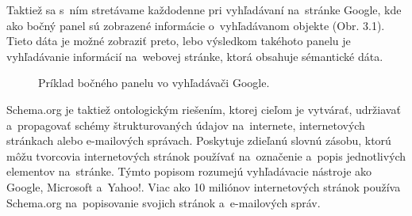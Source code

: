 \documentclass[12pt, a4paper, oneside]{book}
\begin{document}

Taktiež sa s~ním stretávame každodenne pri vyhľadávaní na~stránke Google, kde ako bočný panel sú zobrazené informácie o~vyhľadávanom objekte (Obr. 3.1). Tieto dáta je možné zobraziť preto, lebo výsledkom takéhoto panelu je vyhľadávanie informácií na~webovej stránke, ktorá obsahuje sémantické dáta.

\begin{figure}[h]
\label{fig:semantic_web}
\caption{Príklad bočného panelu vo vyhľadávači Google.}
\end{figure}

Schema.org \cite{schemaOrg} je taktiež ontologickým riešením, ktorej cieľom je vytvárať, udržiavať a~propagovať schémy štrukturovaných údajov na~internete, internetových stránkach alebo e-mailových správach. Poskytuje zdieľanú slovnú zásobu, ktorú môžu tvorcovia internetových stránok používať na~označenie a~popis jednotlivých elementov na~stránke. Týmto popisom rozumejú vyhľadávacie nástroje ako Google, Microsoft a~Yahoo!. Viac ako 10 miliónov internetových stránok používa Schema.org na~popisovanie svojich stránok a~e-mailových správ.
\end{document}
